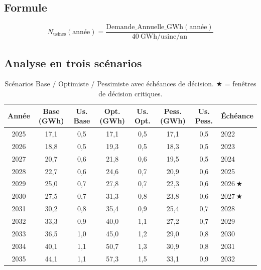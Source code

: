 \documentclass[12pt,a4paper]{article}
\begin{document}
\subsection{Formule}

\begin{formulebox}
\begin{equation}
  N_{\text{usines}}(\text{année}) =
    \frac{\text{Demande\_Annuelle\_GWh}(\text{année})}{40\ \text{GWh/usine/an}}
\end{equation}
\end{formulebox}

\subsection{Analyse en trois scénarios}

\begin{table}[H]
\centering
\caption{Scénarios Base / Optimiste / Pessimiste avec échéances de décision.
  $\bigstar$ = fenêtres de décision critiques.}
\small
\begin{tabular}{cccccccl}
\toprule
\textbf{Année}
  & \textbf{Base (GWh)} & \textbf{Us. Base}
  & \textbf{Opt. (GWh)} & \textbf{Us. Opt.}
  & \textbf{Pess. (GWh)} & \textbf{Us. Pess.}
  & \textbf{Échéance} \\
\midrule
2025 & 17,1 & 0,5 & 17,1 & 0,5 & 17,1 & 0,5 & 2022 \\
2026 & 18,8 & 0,5 & 19,3 & 0,5 & 18,3 & 0,5 & 2023 \\
2027 & 20,7 & 0,6 & 21,8 & 0,6 & 19,5 & 0,5 & 2024 \\
2028 & 22,7 & 0,6 & 24,6 & 0,7 & 20,9 & 0,6 & 2025 \\
\rowcolor{rowblue}
2029 & 25,0 & 0,7 & 27,8 & 0,7 & 22,3 & 0,6 & 2026\,$\bigstar$ \\
\rowcolor{rowblue}
2030 & 27,5 & 0,7 & 31,3 & 0,8 & 23,8 & 0,6 & 2027\,$\bigstar$ \\
2031 & 30,2 & 0,8 & 35,4 & 0,9 & 25,4 & 0,7 & 2028 \\
2032 & 33,3 & 0,9 & 40,0 & 1,1 & 27,2 & 0,7 & 2029 \\
2033 & 36,5 & 1,0 & 45,0 & 1,2 & 29,0 & 0,8 & 2030 \\
2034 & 40,1 & 1,1 & 50,7 & 1,3 & 30,9 & 0,8 & 2031 \\
2035 & 44,1 & 1,1 & 57,3 & 1,5 & 33,1 & 0,9 & 2032 \\
\bottomrule
\end{tabular}
\end{table}
\end{document}
